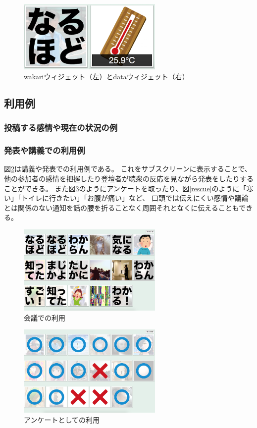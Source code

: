 \begin{figure}[h]
\centering
\includegraphics[width=7cm]{images/widget.eps}
\caption{wakariウィジェット（左）とdataウィジェット（右）}
\label{widget}
\end{figure}

\subsection{利用例}

\subsubsection{投稿する感情や現在の状況の例}



\subsubsection{発表や講義での利用例}

図\ref{discussion}は講義や発表での利用例である。
これをサブスクリーンに表示することで、他の参加者の感情を把握したり登壇者が聴衆の反応を見ながら発表をしたりすることができる。
また図\ref{vote}のようにアンケートを取ったり、図\ref{rescue}のように「寒い」「トイレに行きたい」「お腹が痛い」など、
口頭では伝えにくい感情や議論とは関係のない通知を話の腰を折ることなく周囲それとなくに伝えることもできる。

\begin{figure}[h]
\centering
\includegraphics[width=7cm]{images/discussion.eps}
\caption{会議での利用}
\label{discussion}
\end{figure}

\begin{figure}[h]
\centering
\includegraphics[width=7cm]{images/vote.eps}
\caption{アンケートとしての利用}
\label{vote}
\end{figure}

